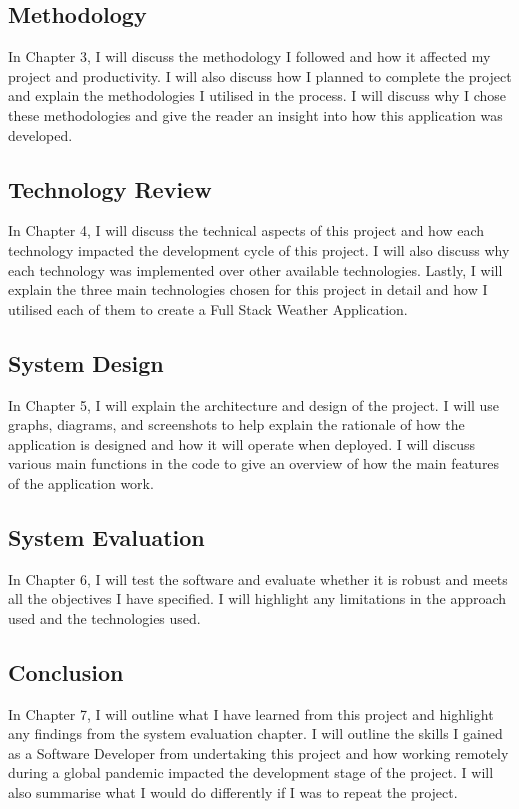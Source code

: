 \subsection{Methodology}
In Chapter 3, I will discuss the methodology I followed and how it affected my project and productivity. I will also discuss how I planned to complete the project and explain the methodologies I utilised in the process. I will discuss why I chose these methodologies and give the reader an insight into how this application was developed. 

\subsection{Technology Review}
In Chapter 4, I will discuss the technical aspects of this project and how each technology impacted the development cycle of this project. I will also discuss why each technology was implemented over other available technologies. Lastly, I will explain the three main technologies chosen for this project in detail and how I utilised each of them to create a Full Stack Weather Application. 

\subsection{System Design}
In Chapter 5, I will explain the architecture and design of the project. I will use graphs, diagrams, and screenshots to help explain the rationale of how the application is designed and how it will operate when deployed. I will discuss various main functions in the code to give an overview of how the main features of the application work.

\subsection{System Evaluation}
In Chapter 6, I will test the software and evaluate whether it is robust and meets all the objectives I have specified. I will highlight any limitations in the approach used and the technologies used.

\subsection{Conclusion}
In Chapter 7, I will outline what I have learned from this project and highlight any findings from the system evaluation chapter. I will outline the skills I gained as a Software Developer from undertaking this project and how working remotely during a global pandemic impacted the development stage of the project. I will also summarise what I would do differently if I was to repeat the project.

